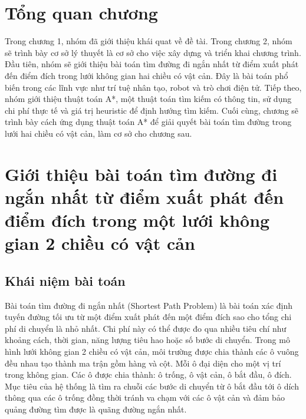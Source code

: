 \documentclass[12pt,a4paper]{report}
\begin{document}
\section*{Tổng quan chương}
Trong chương 1, nhóm đã giới thiệu khái quat về đề tài. Trong chương 2, nhóm sẽ trình bày cơ sở lý thuyết là cơ sở cho việc xây dựng và triển khai chương trình. Đầu tiên, nhóm sẽ giới thiệu  bài toán tìm đường đi ngắn nhất từ điểm xuất phát đến điểm đích trong lưới không gian hai chiều có vật cản. Đây là bài toán phổ biến trong các lĩnh vực như trí tuệ nhân tạo, robot và trò chơi điện tử. Tiếp theo, nhóm giới thiệu thuật toán A*, một thuật toán tìm kiếm có thông tin, sử dụng chi phí thực tế và giá trị heuristic để định hướng tìm kiếm. Cuối cùng, chương sẽ trình bày cách ứng dụng thuật toán A* để giải quyết bài toán tìm đường trong lưới hai chiều có vật cản, làm cơ sở cho chương sau.

\section{Giới thiệu bài toán tìm đường đi ngắn nhất từ điểm xuất phát đến điểm đích trong một lưới không gian 2 chiều có vật cản}

\subsection{Khái niệm bài toán}
Bài toán tìm đường đi ngắn nhất (Shortest Path Problem) là bài toán xác định tuyến đường tối ưu từ một điểm xuất phát đến một điểm đích sao cho tổng chi phí di chuyển là nhỏ nhất. Chi phí này có thể được đo qua nhiều tiêu chí như khoảng cách, thời gian, năng lượng tiêu hao hoặc số bước di chuyển.
Trong mô hình lưới không gian 2 chiều có vật cản, môi trường được chia thành các ô vuông đều nhau tạo thành ma trận gồm hàng và cột. Mỗi ô đại diện cho một vị trí trong không gian. Các ô được chia thành: ô trống, ô vật cản, ô bắt đầu, ô đích.
Mục tiêu của hệ thống là tìm ra chuỗi các bước di chuyển từ ô bắt đầu tới ô dích thông qua các ô trống đồng thời tránh va chạm với các ô vật cản và đảm bảo quảng đường tìm được là quãng đường ngắn nhất. 
\end{document}
